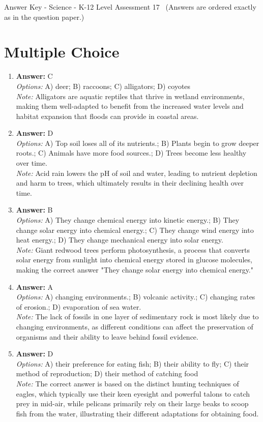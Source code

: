 \documentclass[12pt]{article}
\begin{document}
\begin{center}
Answer Key - Science - K-12 Level Assessment 17 \
\small (Answers are ordered exactly as in the question paper.)
\end{center}

\section*{Multiple Choice}
\begin{enumerate}[label=\arabic*.]
\item \textbf{Answer:} C
\\ \textit{Options:} A) deer; B) raccoons; C) alligators; D) coyotes
\\ \textit{Note:} Alligators are aquatic reptiles that thrive in wetland environments, making them well-adapted to benefit from the increased water levels and habitat expansion that floods can provide in coastal areas.
\item \textbf{Answer:} D
\\ \textit{Options:} A) Top soil loses all of its nutrients.; B) Plants begin to grow deeper roots.; C) Animals have more food sources.; D) Trees become less healthy over time.
\\ \textit{Note:} Acid rain lowers the pH of soil and water, leading to nutrient depletion and harm to trees, which ultimately results in their declining health over time.
\item \textbf{Answer:} B
\\ \textit{Options:} A) They change chemical energy into kinetic energy.; B) They change solar energy into chemical energy.; C) They change wind energy into heat energy.; D) They change mechanical energy into solar energy.
\\ \textit{Note:} Giant redwood trees perform photosynthesis, a process that converts solar energy from sunlight into chemical energy stored in glucose molecules, making the correct answer "They change solar energy into chemical energy."
\item \textbf{Answer:} A
\\ \textit{Options:} A) changing environments.; B) volcanic activity.; C) changing rates of erosion.; D) evaporation of sea water.
\\ \textit{Note:} The lack of fossils in one layer of sedimentary rock is most likely due to changing environments, as different conditions can affect the preservation of organisms and their ability to leave behind fossil evidence.
\item \textbf{Answer:} D
\\ \textit{Options:} A) their preference for eating fish; B) their ability to fly; C) their method of reproduction; D) their method of catching food
\\ \textit{Note:} The correct answer is based on the distinct hunting techniques of eagles, which typically use their keen eyesight and powerful talons to catch prey in mid-air, while pelicans primarily rely on their large beaks to scoop fish from the water, illustrating their different adaptations for obtaining food.
\end{enumerate}
\end{document}
